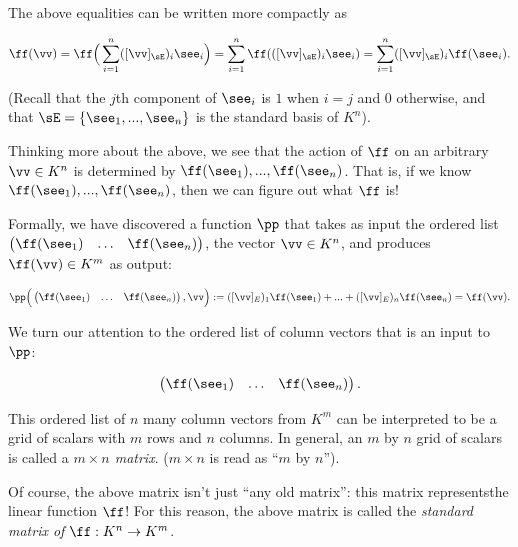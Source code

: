 \begin{deriv}
    The above equalities can be written more compactly as
    
    \begin{align*}
        \ff(\vv) = \ff\Big( \sum_{i = 1}^n ([\vv]_\sE)_i \see_i \Big) = \sum_{i = 1}^n \ff(([\vv]_\sE)_i \see_i) = \sum_{i = 1}^n ([\vv]_\sE)_i \ff(\see_i).
    \end{align*}
    
    (Recall that the $j$th component of $\see_i$ is $1$ when $i = j$ and $0$ otherwise, and that $\sE = \{\see_1, ..., \see_n\}$ is the standard basis of $K^n$).
    
    Thinking more about the above, we see that the action of $\ff$ on an arbitrary $\vv \in K^n$ is determined by $\ff(\see_1), ..., \ff(\see_n)$. That is, if we know $\ff(\see_1), ..., \ff(\see_n)$, then we can figure out what $\ff$ is!
    
    Formally, we have discovered a function $\pp$ that takes as input the ordered list $\begin{pmatrix} \ff(\see_1) & \hdots & \ff(\see_n) \end{pmatrix}$, the vector $\vv \in K^n$, and produces $\ff(\vv) \in K^m$ as output:
    
    \begin{align*}
        \pp\Big( \begin{pmatrix} \ff(\see_1) & \hdots & \ff(\see_n) \end{pmatrix}, \vv \Big) := ([\vv]_E)_1 \ff(\see_1) + ... + ([\vv]_E)_n \ff(\see_n) = \ff(\vv).
    \end{align*}
    
    We turn our attention to the ordered list of column vectors that is an input to $\pp$:
    
    \begin{align*}
        \begin{pmatrix} 
            \ff(\see_1) & \hdots & \ff(\see_n)
        \end{pmatrix}.
    \end{align*}
    
    This ordered list of $n$ many column vectors from $K^m$ can be interpreted to be a grid of scalars with $m$ rows and $n$ columns. In general, an $m$ by $n$ grid of scalars is called a \textit{$m \times n$ matrix}. ($m \times n$ is read as ``$m$ by $n$'').
    
    Of course, the above matrix isn't just ``any old matrix'': this matrix represents\footnotemark the linear function $\ff$! For this reason, the above matrix is called the \textit{standard matrix of $\ff:K^n \rightarrow K^m$}.
    
\end{deriv}

